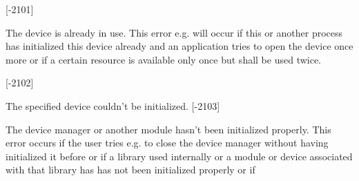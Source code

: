\begin{Desc}
\begin{description}
{\bfseries }\mbox{[}-\/2101\mbox{]} \item[{\em 
\hypertarget{group___common_interface_gga112225e5fbaaaef6445ff4ebf98f8e03a8f4b0465bf6e0d23a1d4ab006b7aa930}{D\+M\+R\+\_\+\+D\+R\+V\+\_\+\+A\+L\+R\+E\+A\+D\+Y\+\_\+\+I\+N\+\_\+\+U\+S\+E}\label{group___common_interface_gga112225e5fbaaaef6445ff4ebf98f8e03a8f4b0465bf6e0d23a1d4ab006b7aa930}
}]The device is already in use. This error e.\+g. will occur if this or another process has initialized this device already and an application tries to open the device once more or if a certain resource is available only once but shall be used twice.

{\bfseries }\mbox{[}-\/2102\mbox{]} \item[{\em 
\hypertarget{group___common_interface_gga112225e5fbaaaef6445ff4ebf98f8e03ad2c988da644e2ae3916e255cdf0f6b0b}{D\+M\+R\+\_\+\+D\+E\+V\+\_\+\+C\+A\+N\+N\+O\+T\+\_\+\+O\+P\+E\+N}\label{group___common_interface_gga112225e5fbaaaef6445ff4ebf98f8e03ad2c988da644e2ae3916e255cdf0f6b0b}
}]The specified device couldn't be initialized. {\bfseries }\mbox{[}-\/2103\mbox{]} \item[{\em 
\hypertarget{group___common_interface_gga112225e5fbaaaef6445ff4ebf98f8e03aee6023a9c41693929279cc223e1a1c40}{D\+M\+R\+\_\+\+N\+O\+T\+\_\+\+I\+N\+I\+T\+I\+A\+L\+I\+Z\+E\+D}\label{group___common_interface_gga112225e5fbaaaef6445ff4ebf98f8e03aee6023a9c41693929279cc223e1a1c40}
}]The device manager or another module hasn't been initialized properly. This error occurs if the user tries e.\+g. to close the device manager without having initialized it before or if a library used internally or a module or device associated with that library has has not been initialized properly or if


\end{description}
\end{Desc}

